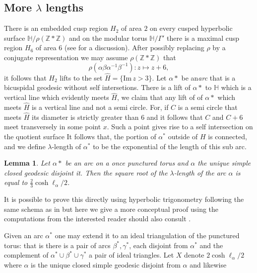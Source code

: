 \documentclass[12pt,a4paper]{amsart}
\newtheorem{lem}[thm]{Lemma}
\def\HH{\mathbb{H}}
\def\im{\mathrm{Im}\,}
\def\xx{\HH/\Gamma'}
\def\ZZ{\mathbb{Z}}
\begin{document}
\subsection{More $\lambda$ lengths}

There is an embedded cusp region $H_2$  of area $2$ on every cusped hyperbolic surface
$\HH/\rho(\ZZ*\ZZ)$ and on the modular torus $\xx$ there is a maximal cusp
region $H_6$ of area $6$ (see \cite{thesis} for a discussion).
After possibly replacing $\rho$ by a conjugate representation we may assume
$\rho(\ZZ*\ZZ)$  that $$\rho(\alpha\beta\alpha^{-1}\beta^{-1}): z \mapsto z +
6,$$ it follows that $H_2$ lifts to the set $\hat{H} = \{ \im z > 3 \}$. Let
$\alpha*$ be an\textit{arc} that is a bicuspidal geodesic without self
intersetions. There is a lift of $\alpha*$ to $\HH$ which is a vertical line
which evidently meets $\hat{H}$, we claim that any lift of of $\alpha*$ which
meets $\hat{H}$ is a vertical line and not a semi circle. For, if $C$ is a semi
circle that meets $\hat{H}$ its diameter is strictly greater than $6$ and it
follows that $C$ and $C + 6$ meet transversely in some point $x$. Such a point
gives rise to a self intersection on the quotient surface It follows that, the
portion of $\alpha^*$ outside of $H$ is connected, and we define
$\lambda$-length  of $\alpha^*$ to be the exponential of the length of this sub
arc.

\begin{lem}\label{lambda length}
Let $\alpha*$ be an arc on a once punctured torus 
and $\alpha$ the unique 
simple closed geodesic disjoint it.
Then the square root of the $\lambda$-length  of the arc $\alpha$
is equal to $\frac{2}{3}\cosh \ell_\alpha / 2$.
\end{lem}

It is possible to prove this directly using hyperbolic trigonometry 
following the same schema as in \cite{thesis}
but here we give a more conceptual proof  using the computations from \cite{saw}
the interested reader should also consult \cite{yi thesis}.

Given an arc $\alpha^*$ one may extend it to an ideal triangulation of the
punctured torus: that is there is a pair of arcs $\beta^*,\gamma^*$, each
disjoint from  $\alpha^*$ and the complement of $\alpha^* \cup \beta^* \cup
\gamma^*$ a pair of ideal triangles. Let $X$ denote $2 \cosh \ell_\alpha / 2$
where $\alpha$ is the unique closed simple geodesic disjoint from $\alpha$ and
likewise
\end{document}

